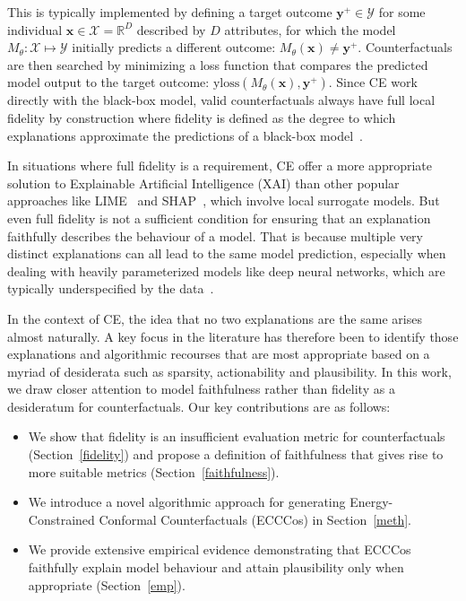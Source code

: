 \documentclass{article}
\begin{document}
This is typically implemented by defining a target outcome $\mathbf{y}^+ \in \mathcal{Y}$ for some individual $\mathbf{x} \in \mathcal{X}=\mathbb{R}^D$ described by $D$ attributes, for which the model $M_{\theta}:\mathcal{X}\mapsto\mathcal{Y}$ initially predicts a different outcome: $M_{\theta}(\mathbf{x})\ne \mathbf{y}^+$. Counterfactuals are then searched by minimizing a loss function that compares the predicted model output to the target outcome: $\text{yloss}(M_{\theta}(\mathbf{x}),\mathbf{y}^+)$. Since CE work directly with the black-box model, valid counterfactuals always have full local fidelity by construction where fidelity is defined as the degree to which explanations approximate the predictions of a black-box model~\citep{mothilal2020explaining,molnar2020interpretable}. 

In situations where full fidelity is a requirement, CE offer a more appropriate solution to Explainable Artificial Intelligence (XAI) than other popular approaches like LIME~\citep{ribeiro2016why} and SHAP~\citep{lundberg2017unified}, which involve local surrogate models. But even full fidelity is not a sufficient condition for ensuring that an explanation faithfully describes the behaviour of a model. That is because multiple very distinct explanations can all lead to the same model prediction, especially when dealing with heavily parameterized models like deep neural networks, which are typically underspecified by the data~\citep{wilson2020case}.

In the context of CE, the idea that no two explanations are the same arises almost naturally. A key focus in the literature has therefore been to identify those explanations and algorithmic recourses that are most appropriate based on a myriad of desiderata such as sparsity, actionability and plausibility. In this work, we draw closer attention to model faithfulness rather than fidelity as a desideratum for counterfactuals. Our key contributions are as follows: 

\begin{itemize}
  \item We show that fidelity is an insufficient evaluation metric for counterfactuals (Section~\ref{fidelity}) and propose a definition of faithfulness that gives rise to more suitable metrics (Section~\ref{faithfulness}).
  \item We introduce a novel algorithmic approach for generating Energy-Constrained Conformal Counterfactuals (ECCCos) in Section~\ref{meth}.
  \item We provide extensive empirical evidence demonstrating that ECCCos faithfully explain model behaviour and attain plausibility only when appropriate (Section~\ref{emp}).
\end{itemize}
\end{document}
